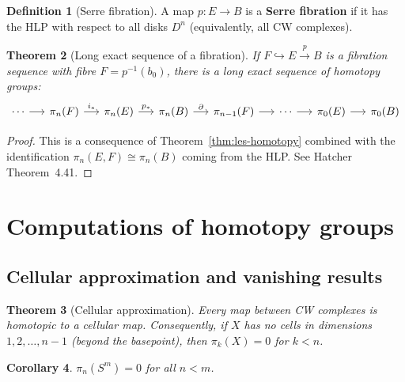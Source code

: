 \documentclass[12pt,a4paper,openany]{book}
\theoremstyle{definition}
\newtheorem{definition}{Definition}[chapter]
\theoremstyle{plain}
\newtheorem{theorem}[definition]{Theorem}
\newtheorem{corollary}[definition]{Corollary}
\theoremstyle{remark}
\begin{document}
\begin{definition}[Serre fibration]
A map $p\colon E\to B$ is a \textbf{Serre fibration} if it has the HLP
with respect to all disks $D^n$ (equivalently, all CW complexes).
\end{definition}

\begin{theorem}[Long exact sequence of a fibration]
\label{thm:les-fibration}
If $F\hookrightarrow E\xrightarrow{p}B$ is a fibration sequence with
fibre $F=p^{-1}(b_0)$, there is a long exact sequence of homotopy
groups:
\[
\begin{tikzcd}[column sep=1.4em]
  \cdots \ar[r]
  & \pi_n(F) \ar[r,"i_*"]
  & \pi_n(E) \ar[r,"p_*"]
  & \pi_n(B) \ar[r,"\partial"]
  & \pi_{n-1}(F) \ar[r]
  & \cdots \ar[r]
  & \pi_0(E) \ar[r]
  & \pi_0(B)
\end{tikzcd}
\]
\end{theorem}

\begin{proof}
This is a consequence of Theorem~\ref{thm:les-homotopy} combined with
the identification $\pi_n(E,F)\cong\pi_n(B)$ coming from the HLP.
See Hatcher~\cite{hatcher} Theorem~4.41.
\end{proof}

\section{Computations of homotopy groups}\label{sec:pin-computations}

\subsection{Cellular approximation and vanishing results}

\begin{theorem}[Cellular approximation]
\label{thm:cellular-approx}
Every map between CW complexes is homotopic to a cellular map.
Consequently, if $X$ has no cells in dimensions $1,2,\dots,n-1$
(beyond the basepoint), then $\pi_k(X)=0$ for $k<n$.
\end{theorem}

\begin{corollary}
\label{cor:pin-sphere-vanishing}
$\pi_n(S^m)=0$ for all $n<m$.
\end{corollary}
\end{document}
